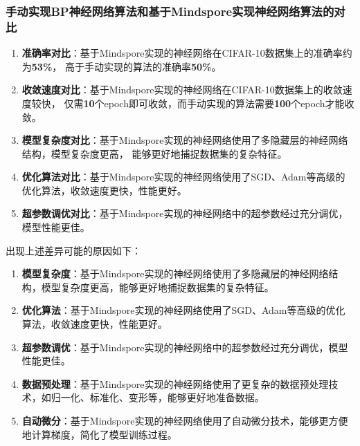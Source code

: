\documentclass[12pt]{article}
\begin{document}
\subsubsection{手动实现BP神经网络算法和基于Mindspore实现神经网络算法的对比}
\begin{enumerate}
  \item \textbf{准确率对比}：基于Mindspore实现的神经网络在CIFAR-10数据集上的准确率约为\textbf{53\%}，
        高于手动实现的算法的准确率\textbf{50\%}。
  \item \textbf{收敛速度对比}：基于Mindspore实现的神经网络在CIFAR-10数据集上的收敛速度较快，
        仅需\textbf{10}个epoch即可收敛，而手动实现的算法需要\textbf{100}个epoch才能收敛。
  \item \textbf{模型复杂度对比}：基于Mindspore实现的神经网络使用了多隐藏层的神经网络结构，模型复杂度更高，
        能够更好地捕捉数据集的复杂特征。
  \item \textbf{优化算法对比}：基于Mindspore实现的神经网络使用了SGD、Adam等高级的优化算法，收敛速度更快，性能更好。
  \item \textbf{超参数调优对比}：基于Mindspore实现的神经网络中的超参数经过充分调优，模型性能更佳。
\end{enumerate}

出现上述差异可能的原因如下：
\begin{enumerate}
  \item \textbf{模型复杂度}：基于Mindspore实现的神经网络使用了多隐藏层的神经网络结构，模型复杂度更高，能够更好地捕捉数据集的复杂特征。
  \item \textbf{优化算法}：基于Mindspore实现的神经网络使用了SGD、Adam等高级的优化算法，收敛速度更快，性能更好。
  \item \textbf{超参数调优}：基于Mindspore实现的神经网络中的超参数经过充分调优，模型性能更佳。
  \item \textbf{数据预处理}：基于Mindspore实现的神经网络使用了更复杂的数据预处理技术，如归一化、标准化、变形等，能够更好地准备数据。
  \item \textbf{自动微分}：基于Mindspore实现的神经网络使用了自动微分技术，能够更方便地计算梯度，简化了模型训练过程。
\end{enumerate}
\end{document}
